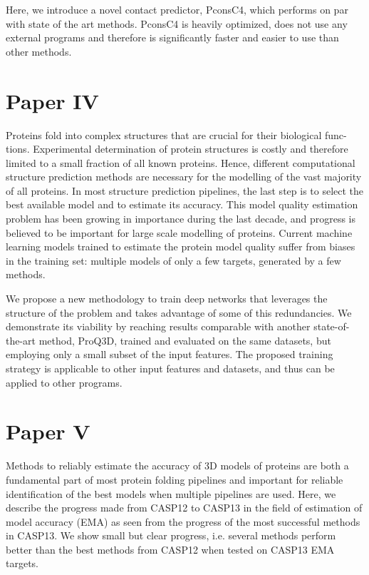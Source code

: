 Here, we introduce a novel contact predictor, PconsC4, which performs on par with state of the art methods. PconsC4 is heavily optimized, does not use any external programs and therefore is significantly faster and easier to use than other methods.

\section{Paper IV}
 Proteins fold into complex structures that are crucial for their biological func-
tions. Experimental determination of protein structures is costly and therefore limited to a small
fraction of all known proteins. Hence, different computational structure prediction methods are
necessary for the modelling of the vast majority of all proteins. In most structure prediction
pipelines, the last step is to select the best available model and to estimate its accuracy. This
model quality estimation problem has been growing in importance during the last decade, and
progress is believed to be important for large scale modelling of proteins.
Current machine learning models trained to estimate the protein model quality suffer from
biases in the training set: multiple models of only a few targets, generated by a few methods.

 We propose a new methodology to train deep networks that leverages the structure of
the problem and takes advantage of some of this redundancies. We demonstrate its viability by
reaching results comparable with another state-of-the-art method, ProQ3D, trained and evaluated
on the same datasets, but employing only a small subset of the input features.
The proposed training strategy is applicable to other input features and datasets, and thus can
be applied to other programs.


\section{Paper V}

Methods to reliably estimate the accuracy of 3D models of proteins are both a fundamental part
of most protein folding pipelines and important for reliable identification of the best models when
multiple pipelines are used. Here, we describe the progress made from CASP12 to CASP13 in
the field of estimation of model accuracy (EMA) as seen from the progress of the most
successful methods in CASP13. We show small but clear progress, i.e. several methods
perform better than the best methods from CASP12 when tested on CASP13 EMA targets.